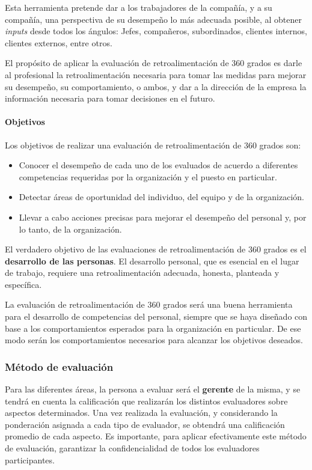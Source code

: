 Esta herramienta pretende dar a los trabajadores de la compañía, y a su compañía, una perspectiva de su desempeño lo más adecuada posible, al obtener \textit{inputs} desde todos los ángulos: Jefes, compañeros, subordinados, clientes internos, clientes externos, entre otros.

El propósito de aplicar la evaluación de retroalimentación de 360 grados es darle al profesional la retroalimentación necesaria para tomar las medidas para mejorar su desempeño, su comportamiento, o ambos, y dar a la dirección de la empresa la información necesaria para tomar decisiones en el futuro.


\paragraph{Objetivos}

Los objetivos de realizar una evaluación de retroalimentación de 360 grados son:

\begin{itemize}
    \item Conocer el desempeño de cada uno de los evaluados de acuerdo a diferentes competencias requeridas por la organización y el puesto en particular.
    \item Detectar áreas de oportunidad del individuo, del equipo y de la organización.
    \item Llevar a cabo acciones precisas para mejorar el desempeño del personal y, por lo  tanto, de la organización.
\end{itemize}

El verdadero objetivo de las evaluaciones de retroalimentación de 360 grados es el \textbf{desarrollo de las personas}.
El desarrollo personal, que es esencial en el lugar de trabajo, requiere una retroalimentación adecuada, honesta, planteada y específica.

La evaluación de retroalimentación de 360 grados será una buena herramienta para el desarrollo de competencias del personal, siempre que se haya diseñado con base a los comportamientos esperados para la organización en particular.
De ese modo serán los comportamientos necesarios para alcanzar los objetivos deseados.


\subsubsection{Método de evaluación}

Para las diferentes áreas, la persona a evaluar será el \textbf{gerente} de la misma, y se tendrá en cuenta la calificación que realizarán los distintos evaluadores sobre aspectos determinados.
Una vez realizada la evaluación, y considerando la ponderación asignada a cada tipo de evaluador, se obtendrá una calificación promedio de cada aspecto.
Es importante, para aplicar efectivamente este método de evaluación, garantizar la confidencialidad de todos los evaluadores participantes.

